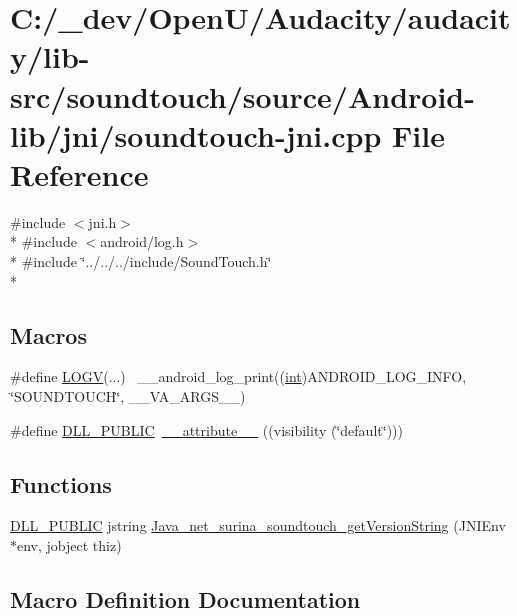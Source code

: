 \hypertarget{soundtouch-jni_8cpp}{}\section{C\+:/\+\_\+dev/\+Open\+U/\+Audacity/audacity/lib-\/src/soundtouch/source/\+Android-\/lib/jni/soundtouch-\/jni.cpp File Reference}
\label{soundtouch-jni_8cpp}
{\ttfamily \#include $<$jni.\+h$>$}\\*
{\ttfamily \#include $<$android/log.\+h$>$}\\*
{\ttfamily \#include \char`\"{}../../../include/\+Sound\+Touch.\+h\char`\"{}}\\*
\subsection*{Macros}
\begin{DoxyCompactItemize}
\item 
\#define \hyperlink{soundtouch-jni_8cpp_afdb72406e2b17b8d402d726b594728a1}{L\+O\+GV}(...)  ~\+\_\+\+\_\+android\+\_\+log\+\_\+print((\hyperlink{xmltok_8h_a5a0d4a5641ce434f1d23533f2b2e6653}{int})A\+N\+D\+R\+O\+I\+D\+\_\+\+L\+O\+G\+\_\+\+I\+N\+FO, \char`\"{}S\+O\+U\+N\+D\+T\+O\+U\+CH\char`\"{}, \+\_\+\+\_\+\+V\+A\+\_\+\+A\+R\+G\+S\+\_\+\+\_\+)
\item 
\#define \hyperlink{soundtouch-jni_8cpp_a29047de4dfe891435d8254535634ac1d}{D\+L\+L\+\_\+\+P\+U\+B\+L\+IC}~\hyperlink{cdefs_8h_a5204e929e9e5b86761cfc83b51145602}{\+\_\+\+\_\+attribute\+\_\+\+\_\+} ((visibility (\char`\"{}default\char`\"{})))
\end{DoxyCompactItemize}
\subsection*{Functions}
\begin{DoxyCompactItemize}
\item 
\hyperlink{soundtouch-jni_8cpp_a29047de4dfe891435d8254535634ac1d}{D\+L\+L\+\_\+\+P\+U\+B\+L\+IC} jstring \hyperlink{soundtouch-jni_8cpp_aa1d4e7b8084853b9784954f36b4f1cf6}{Java\+\_\+net\+\_\+surina\+\_\+soundtouch\+\_\+get\+Version\+String} (J\+N\+I\+Env $\ast$env, jobject thiz)
\end{DoxyCompactItemize}


\subsection{Macro Definition Documentation}
